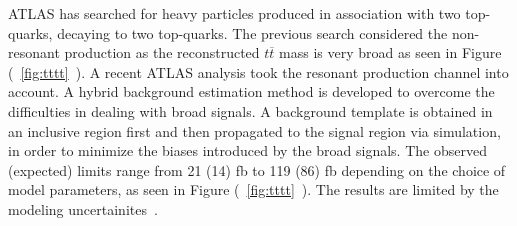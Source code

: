 \documentclass{moriond}
\begin{document}
ATLAS has searched for heavy particles produced in association with two
top-quarks, decaying to two top-quarks. The previous search considered the
non-resonant production as the reconstructed $t\overline{t}$ mass is very broad
as seen in Figure (~\ref{fig:tttt}~). A recent ATLAS analysis
took the resonant production channel into account. A hybrid background
estimation method is developed to overcome the difficulties in dealing with
broad signals. A background template is obtained in an inclusive region first
and then propagated to the signal region via simulation, in order to minimize
the biases introduced by the broad signals. The observed (expected) limits
range from 21 (14) fb to 119 (86) fb depending on the choice of model
parameters, as seen in Figure (~\ref{fig:tttt}~). The
results are limited by the modeling uncertainites~\cite{tttt}.\\    
\end{document}

